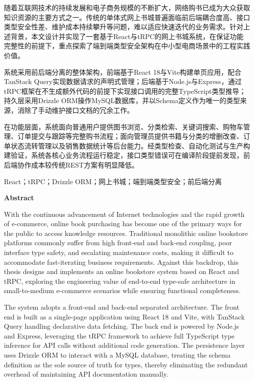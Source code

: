 \documentclass[12pt,a4paper]{ctexart}
\begin{document}
随着互联网技术的持续发展和电子商务规模的不断扩大，网络购书已成为大众获取知识资源的主要方式之一。传统的单体式网上书城普遍面临前后端耦合度高、接口类型安全性差、维护成本持续攀升等问题，难以适应快速迭代的业务需求。针对上述背景，本文设计并实现了一套基于React与tRPC的网上书城系统，在保证功能完整性的前提下，重点探索了端到端类型安全架构在中小型电商场景中的工程实践价值。

系统采用前后端分离的整体架构，前端基于React 18与Vite构建单页应用，配合TanStack Query实现数据请求的声明式管理；后端基于Node.js与Express，通过tRPC框架在不生成额外代码的前提下实现接口调用的完整TypeScript类型推导；持久层采用Drizzle ORM操作MySQL数据库，并以Schema定义作为唯一的类型来源，消除了手动维护接口文档的冗余工作。

在功能层面，系统面向普通用户提供图书浏览、分类检索、关键词搜索、购物车管理、订单提交与跟踪等完整购书流程；面向管理员提供书籍与分类的增删改查、订单状态流转管理以及销售数据统计等后台能力。经类型检查、自动化测试与生产构建验证，系统各核心业务流程运行稳定，接口类型错误可在编译阶段提前发现，前后端协作成本较传统REST方案有明显降低。

\vspace{0.5cm}
React；tRPC；Drizzle ORM；网上书城；端到端类型安全；前后端分离
\newpage

\begin{center}
  {\textbf{Abstract}}
\end{center}
\vspace{0.5cm}

With the continuous advancement of Internet technologies and the rapid growth of e-commerce, online book purchasing has become one of the primary ways for the public to access knowledge resources. Traditional monolithic online bookstore platforms commonly suffer from high front-end and back-end coupling, poor interface type safety, and escalating maintenance costs, making it difficult to accommodate fast-iterating business requirements. Against this backdrop, this thesis designs and implements an online bookstore system based on React and tRPC, exploring the engineering value of end-to-end type-safe architecture in small-to-medium e-commerce scenarios while ensuring functional completeness.

The system adopts a front-end and back-end separated architecture. The front end is built as a single-page application using React 18 and Vite, with TanStack Query handling declarative data fetching. The back end is powered by Node.js and Express, leveraging the tRPC framework to achieve full TypeScript type inference for API calls without additional code generation. The persistence layer uses Drizzle ORM to interact with a MySQL database, treating the schema definition as the sole source of truth for types, thereby eliminating the redundant overhead of maintaining API documentation manually.
\end{document}
